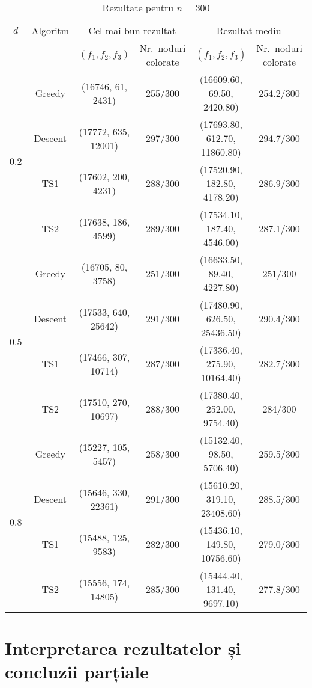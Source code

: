 \begin{table}[H]
\centering
\caption{Rezultate pentru $n = 300$}
\scriptsize
\begin{tabular}{cc  cc  cc}
\toprule
$d$ & Algoritm 
    & \multicolumn{2}{c}{Cel mai bun rezultat} 
    & \multicolumn{2}{c}{Rezultat mediu} \\
\cmidrule(r){3-4} \cmidrule(l){5-6}
& & $(f_1, f_2, f_3)$ & Nr.\ noduri colorate
& $(\overline{f_1}, \overline{f_2}, \overline{f_3})$ & Nr.\ noduri colorate \\
\midrule
\multirow{4}{*}{0.2}
  & Greedy  & (16746, 61, 2431)  & 255/300 & (16609.60, 69.50, 2420.80)   & 254.2/300 \\
  & Descent & (17772, 635, 12001)& 297/300 & (17693.80, 612.70, 11860.80) & 294.7/300 \\
  & TS1     & (17602, 200, 4231) & 288/300 & (17520.90, 182.80, 4178.20)  & 286.9/300 \\
  & TS2     & (17638, 186, 4599) & 289/300 & (17534.10, 187.40, 4546.00)  & 287.1/300 \\
\midrule
\multirow{4}{*}{0.5}
  & Greedy  & (16705, 80, 3758)  & 251/300 & (16633.50, 89.40, 4227.80)   & 251/300 \\
  & Descent & (17533, 640, 25642)& 291/300 & (17480.90, 626.50, 25436.50) & 290.4/300 \\
  & TS1     & (17466, 307, 10714)& 287/300 & (17336.40, 275.90, 10164.40) & 282.7/300 \\
  & TS2     & (17510, 270, 10697)& 288/300 & (17380.40, 252.00, 9754.40)  & 284/300 \\
\midrule
\multirow{4}{*}{0.8}
  & Greedy  & (15227, 105, 5457) & 258/300 & (15132.40, 98.50, 5706.40)   & 259.5/300 \\
  & Descent & (15646, 330, 22361)& 291/300 & (15610.20, 319.10, 23408.60) & 288.5/300 \\
  & TS1     & (15488, 125, 9583) & 282/300 & (15436.10, 149.80, 10756.60)& 279.0/300 \\
  & TS2     & (15556, 174, 14805)& 285/300 & (15444.40, 131.40, 9697.10)  & 277.8/300 \\
\bottomrule
\end{tabular}\label{tab:rezultate_n300}
\end{table}








\section{Interpretarea rezultatelor și concluzii parțiale}
  
